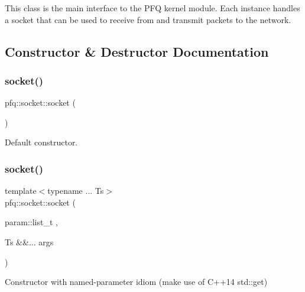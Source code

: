 This class is the main interface to the P\+FQ kernel module. Each instance handles a socket that can be used to receive from and transmit packets to the network. 

\subsection{Constructor \& Destructor Documentation}
\mbox{\label{classpfq_1_1socket_a169a46cd01a5fd0a71919ece48f18d9d}} 
\subsubsection{\texorpdfstring{socket()}{socket()}\hspace{0.1cm}{\footnotesize\ttfamily [1/7]}}
{\footnotesize\ttfamily pfq\+::socket\+::socket (\begin{DoxyParamCaption}{ }\end{DoxyParamCaption})\hspace{0.3cm}{\ttfamily [inline]}}



Default constructor. 

\mbox{\label{classpfq_1_1socket_aa53695f39b45a0fa9520d52a1a35d2bf}} 
\subsubsection{\texorpdfstring{socket()}{socket()}\hspace{0.1cm}{\footnotesize\ttfamily [2/7]}}
{\footnotesize\ttfamily template$<$typename ... Ts$>$ \\
pfq\+::socket\+::socket (\begin{DoxyParamCaption}\item[{param\+::list\+\_\+t}]{,  }\item[{Ts \&\&...}]{args }\end{DoxyParamCaption})\hspace{0.3cm}{\ttfamily [inline]}}



Constructor with named-\/parameter idiom (make use of C++14 std\+::get) 

\mbox{\label{classpfq_1_1socket_ad0e09474a9919723dfdf142e2b1e5386}} 

